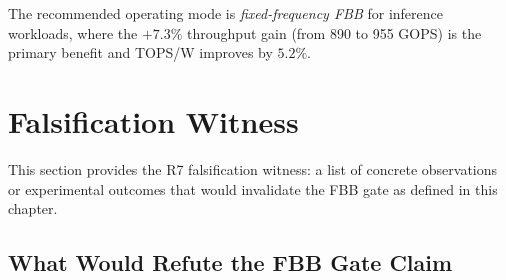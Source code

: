 The recommended operating mode is \emph{fixed-frequency FBB} for
inference workloads, where the $+7.3\%$ throughput gain (from 890 to
955 GOPS) is the primary benefit and TOPS/W improves by $5.2\%$.

\medskip
\noindent\anchorline{}

\section{Falsification Witness}
\label{sec:falsification}

This section provides the R7 falsification witness: a list of concrete
observations or experimental outcomes that would invalidate the FBB gate
as defined in this chapter.

\subsection{What Would Refute the FBB Gate Claim}
\label{subsec:falsification-refute}

